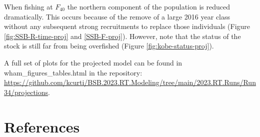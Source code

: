 \documentclass[
]{article}
\begin{document}
When fishing at \(F_{40}\) the northern component of the population is reduced dramatically. This occurs because of the remove of a large 2016 year class without any subsequent strong recruitments to replace those individuals (Figure \ref{fig:SSB-R-time-proj} and \ref{SSB-F-proj}). However, note that the status of the stock is still far from being overfished (Figure \ref{fig:kobe-status-proj}).

A full set of plots for the projected model can be found in wham\_figures\_tables.html in the repository: \url{https://github.com/kcurti/BSB.2023.RT.Modeling/tree/main/2023.RT.Runs/Run34/projections}.

\hypertarget{references}{%
\section*{References}\label{references}}
\end{document}
